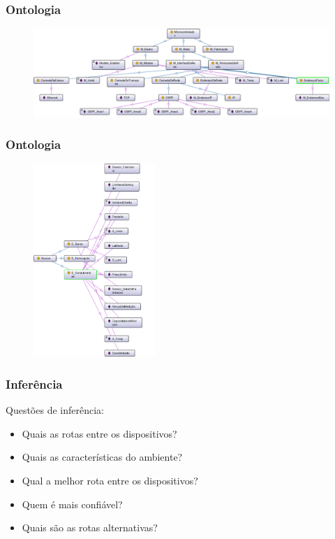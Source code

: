 
\begin{frame}
	\frametitle{Ontologia}
	
	\begin{figure}[h]
		\centering
		\includegraphics[width=1.02\textwidth]{"../Relatorio/Artigo IoT-G4/figs/Microcontrolador"}
		\label{topologia}
 	\end{figure}

\end{frame}


\begin{frame}
	\frametitle{Ontologia}
	
	\begin{figure}[h]
		\centering
		\includegraphics[width=0.41\textwidth]{"../Relatorio/Artigo IoT-G4/figs/Sensor"}
		\label{topologia}
 	\end{figure}

\end{frame}


\begin{frame}
	\frametitle{Inferência}
	Questões de inferência:
	
	\begin{itemize}
		\item Quais as rotas entre os dispositivos?
		\item Quais as características do ambiente?
		\item Qual a melhor rota entre os dispositivos?
		\item Quem é mais confiável?
		\item Quais são as rotas alternativas?
	\end{itemize}
\end{frame}

